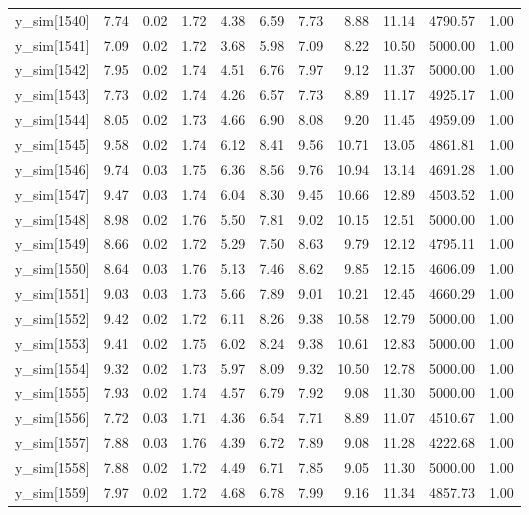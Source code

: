 \begin{table}[ht]
\begin{tabular}{rrrrrrrrrrr}
  y\_sim[1540] & 7.74 & 0.02 & 1.72 & 4.38 & 6.59 & 7.73 & 8.88 & 11.14 & 4790.57 & 1.00 \\ 
  y\_sim[1541] & 7.09 & 0.02 & 1.72 & 3.68 & 5.98 & 7.09 & 8.22 & 10.50 & 5000.00 & 1.00 \\ 
  y\_sim[1542] & 7.95 & 0.02 & 1.74 & 4.51 & 6.76 & 7.97 & 9.12 & 11.37 & 5000.00 & 1.00 \\ 
  y\_sim[1543] & 7.73 & 0.02 & 1.74 & 4.26 & 6.57 & 7.73 & 8.89 & 11.17 & 4925.17 & 1.00 \\ 
  y\_sim[1544] & 8.05 & 0.02 & 1.73 & 4.66 & 6.90 & 8.08 & 9.20 & 11.45 & 4959.09 & 1.00 \\ 
  y\_sim[1545] & 9.58 & 0.02 & 1.74 & 6.12 & 8.41 & 9.56 & 10.71 & 13.05 & 4861.81 & 1.00 \\ 
  y\_sim[1546] & 9.74 & 0.03 & 1.75 & 6.36 & 8.56 & 9.76 & 10.94 & 13.14 & 4691.28 & 1.00 \\ 
  y\_sim[1547] & 9.47 & 0.03 & 1.74 & 6.04 & 8.30 & 9.45 & 10.66 & 12.89 & 4503.52 & 1.00 \\ 
  y\_sim[1548] & 8.98 & 0.02 & 1.76 & 5.50 & 7.81 & 9.02 & 10.15 & 12.51 & 5000.00 & 1.00 \\ 
  y\_sim[1549] & 8.66 & 0.02 & 1.72 & 5.29 & 7.50 & 8.63 & 9.79 & 12.12 & 4795.11 & 1.00 \\ 
  y\_sim[1550] & 8.64 & 0.03 & 1.76 & 5.13 & 7.46 & 8.62 & 9.85 & 12.15 & 4606.09 & 1.00 \\ 
  y\_sim[1551] & 9.03 & 0.03 & 1.73 & 5.66 & 7.89 & 9.01 & 10.21 & 12.45 & 4660.29 & 1.00 \\ 
  y\_sim[1552] & 9.42 & 0.02 & 1.72 & 6.11 & 8.26 & 9.38 & 10.58 & 12.79 & 5000.00 & 1.00 \\ 
  y\_sim[1553] & 9.41 & 0.02 & 1.75 & 6.02 & 8.24 & 9.38 & 10.61 & 12.83 & 5000.00 & 1.00 \\ 
  y\_sim[1554] & 9.32 & 0.02 & 1.73 & 5.97 & 8.09 & 9.32 & 10.50 & 12.78 & 5000.00 & 1.00 \\ 
  y\_sim[1555] & 7.93 & 0.02 & 1.74 & 4.57 & 6.79 & 7.92 & 9.08 & 11.30 & 5000.00 & 1.00 \\ 
  y\_sim[1556] & 7.72 & 0.03 & 1.71 & 4.36 & 6.54 & 7.71 & 8.89 & 11.07 & 4510.67 & 1.00 \\ 
  y\_sim[1557] & 7.88 & 0.03 & 1.76 & 4.39 & 6.72 & 7.89 & 9.08 & 11.28 & 4222.68 & 1.00 \\ 
  y\_sim[1558] & 7.88 & 0.02 & 1.72 & 4.49 & 6.71 & 7.85 & 9.05 & 11.30 & 5000.00 & 1.00 \\ 
  y\_sim[1559] & 7.97 & 0.02 & 1.72 & 4.68 & 6.78 & 7.99 & 9.16 & 11.34 & 4857.73 & 1.00 \\ 

\end{tabular}
\end{table}
